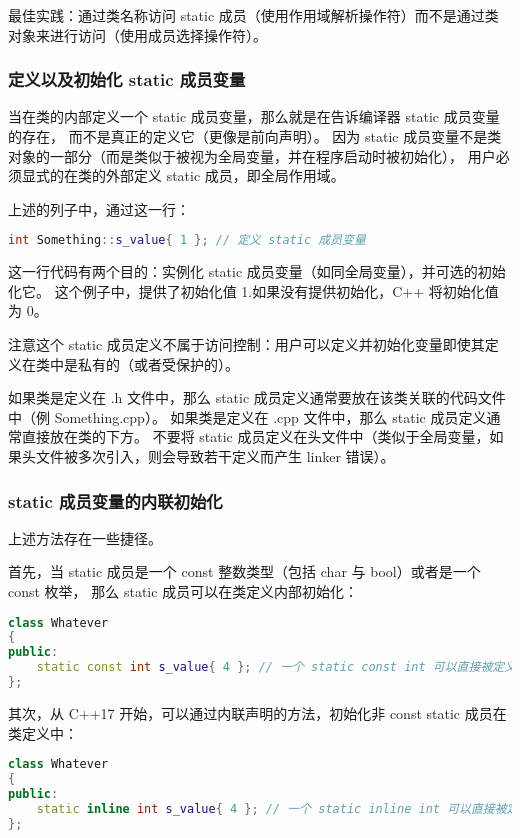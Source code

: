 \documentclass[../../LearnCpp.tex]{subfiles}
\begin{document}
最佳实践：通过类名称访问 static 成员（使用作用域解析操作符）而不是通过类对象来进行访问（使用成员选择操作符）。

\subsubsection*{定义以及初始化 static 成员变量}

当在类的内部定义一个 static 成员变量，那么就是在告诉编译器 static 成员变量的存在，
而不是真正的定义它（更像是前向声明）。
因为 static 成员变量不是类对象的一部分（而是类似于被视为全局变量，并在程序启动时被初始化），
用户必须显式的在类的外部定义 static 成员，即全局作用域。

上述的列子中，通过这一行：

\begin{lstlisting}[language=C++]
int Something::s_value{ 1 }; // 定义 static 成员变量
\end{lstlisting}

这一行代码有两个目的：实例化 static 成员变量（如同全局变量），并可选的初始化它。
这个例子中，提供了初始化值 1.如果没有提供初始化，C++ 将初始化值为 0。

注意这个 static 成员定义不属于访问控制：用户可以定义并初始化变量即使其定义在类中是私有的（或者受保护的）。

如果类是定义在 .h 文件中，那么 static 成员定义通常要放在该类关联的代码文件中（例 Something.cpp）。
如果类是定义在 .cpp 文件中，那么 static 成员定义通常直接放在类的下方。
不要将 static 成员定义在头文件中（类似于全局变量，如果头文件被多次引入，则会导致若干定义而产生 linker 错误）。

\subsubsection*{static 成员变量的内联初始化}

上述方法存在一些捷径。

首先，当 static 成员是一个 const 整数类型（包括 char 与 bool）或者是一个 const 枚举，
那么 static 成员可以在类定义内部初始化：

\begin{lstlisting}[language=C++]
class Whatever
{
public:
    static const int s_value{ 4 }; // 一个 static const int 可以直接被定义以及初始化
};
\end{lstlisting}

其次，从 C++17 开始，可以通过内联声明的方法，初始化非 const static 成员在类定义中：

\begin{lstlisting}[language=C++]
class Whatever
{
public:
    static inline int s_value{ 4 }; // 一个 static inline int 可以直接被定义以及初始化（C++17）
};
\end{lstlisting}
\end{document}
